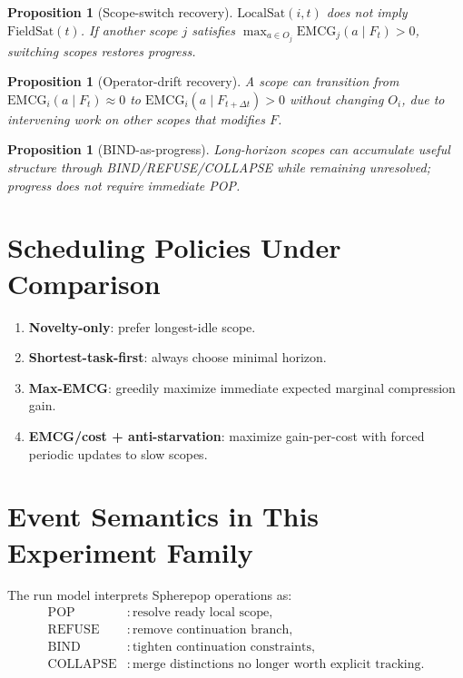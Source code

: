 \documentclass[11pt]{article}
\newtheorem{proposition}[definition]{Proposition}
\begin{document}
\begin{proposition}[Scope-switch recovery]
$\text{LocalSat}(i,t)$ does not imply $\text{FieldSat}(t)$. If another scope $j$ satisfies
$\max_{a\in O_j}\mathrm{EMCG}_j(a\mid F_t)>0$, switching scopes restores progress.
\end{proposition}

\begin{proposition}[Operator-drift recovery]
A scope can transition from
$\mathrm{EMCG}_i(a\mid F_t)\approx0$ to
$\mathrm{EMCG}_i(a\mid F_{t+\Delta t})>0$ without changing $O_i$, due to intervening work on
other scopes that modifies $F$.
\end{proposition}

\begin{proposition}[BIND-as-progress]
Long-horizon scopes can accumulate useful structure through BIND/REFUSE/COLLAPSE while
remaining unresolved; progress does not require immediate POP.
\end{proposition}

\section{Scheduling Policies Under Comparison}

\begin{enumerate}[leftmargin=*]
  \item \textbf{Novelty-only}: prefer longest-idle scope.
  \item \textbf{Shortest-task-first}: always choose minimal horizon.
  \item \textbf{Max-EMCG}: greedily maximize immediate expected marginal compression gain.
  \item \textbf{EMCG/cost + anti-starvation}: maximize gain-per-cost with forced periodic
  updates to slow scopes.
\end{enumerate}

\section{Event Semantics in This Experiment Family}

The run model interprets Spherepop operations as:
\[
\begin{aligned}
\mathrm{POP}&: \text{resolve ready local scope},\\
\mathrm{REFUSE}&: \text{remove continuation branch},\\
\mathrm{BIND}&: \text{tighten continuation constraints},\\
\mathrm{COLLAPSE}&: \text{merge distinctions no longer worth explicit tracking}.\\
\end{aligned}
\]
\end{document}
